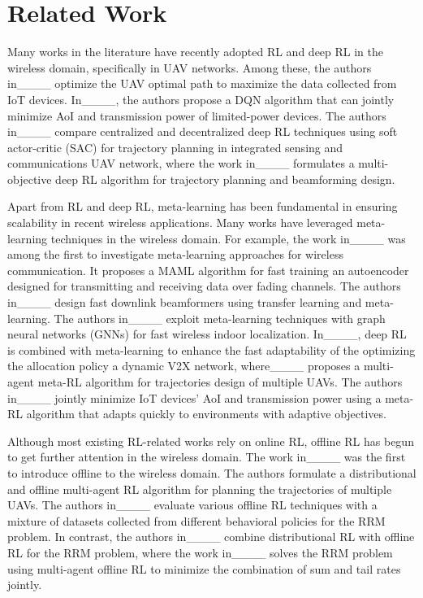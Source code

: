 \section{Related Work}
Many works in the literature have recently adopted RL and deep RL in the wireless domain, specifically in UAV networks. Among these, the authors in____ optimize the UAV optimal path to maximize the data collected from IoT devices. In____, the authors propose a DQN algorithm that can jointly minimize AoI and transmission power of limited-power devices. The authors in____ compare centralized and decentralized deep RL techniques using soft actor-critic (SAC) for trajectory planning in integrated sensing and communications UAV network, where the work in____ formulates a multi-objective deep RL algorithm for trajectory planning and beamforming design.

Apart from RL and deep RL, meta-learning has been fundamental in ensuring scalability in recent wireless applications. Many works have leveraged meta-learning techniques in the wireless domain. For example, the work in____ was among the first to investigate meta-learning approaches for wireless communication. It proposes a MAML algorithm for fast training an autoencoder designed for transmitting and receiving data over fading channels. The authors in____ design fast downlink beamformers using transfer learning and meta-learning. The authors in____ exploit meta-learning techniques with graph neural networks (GNNs) for fast wireless indoor localization. In____, deep RL is combined with meta-learning to enhance the fast adaptability of the optimizing the allocation policy a dynamic V2X network, where____ proposes a multi-agent meta-RL algorithm for trajectories design of multiple UAVs. The authors in____ jointly minimize IoT devices' AoI and transmission power using a meta-RL algorithm that adapts quickly to environments with adaptive objectives.


Although most existing RL-related works rely on online RL, offline RL has begun to get further attention in the wireless domain. The work in____ was the first to introduce offline to the wireless domain. The authors formulate a distributional and offline multi-agent RL algorithm for planning the trajectories of multiple UAVs. The authors in____ evaluate various offline RL techniques with a mixture of datasets collected from different behavioral policies for the RRM problem. In contrast, the authors in____ combine distributional RL with offline RL for the RRM problem, where the work in____ solves the RRM problem using multi-agent offline RL to minimize the combination of sum and tail rates jointly.